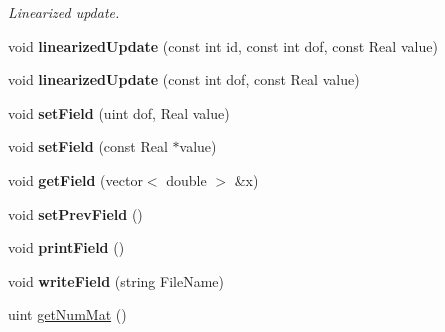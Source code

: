 \begin{DoxyCompactItemize}
\begin{DoxyCompactList}\small\item\em Linearized update. \item\end{DoxyCompactList}\item 
\hypertarget{classvoom_1_1_l_b_model_a55fa144f27472b376293a8aa0a537ddc}{
void {\bfseries linearizedUpdate} (const int id, const int dof, const Real value)}
\label{classvoom_1_1_l_b_model_a55fa144f27472b376293a8aa0a537ddc}

\item 
\hypertarget{classvoom_1_1_l_b_model_acbe155affa8540032f389c3feb633ec1}{
void {\bfseries linearizedUpdate} (const int dof, const Real value)}
\label{classvoom_1_1_l_b_model_acbe155affa8540032f389c3feb633ec1}

\item 
\hypertarget{classvoom_1_1_l_b_model_a86f401fee7322d5b026bb40ad4b2b84b}{
void {\bfseries setField} (uint dof, Real value)}
\label{classvoom_1_1_l_b_model_a86f401fee7322d5b026bb40ad4b2b84b}

\item 
\hypertarget{classvoom_1_1_l_b_model_ac0c33c0e119934319c188d385bbc5db5}{
void {\bfseries setField} (const Real $\ast$value)}
\label{classvoom_1_1_l_b_model_ac0c33c0e119934319c188d385bbc5db5}

\item 
\hypertarget{classvoom_1_1_l_b_model_a169a46c3f6333795817a5772746488f7}{
void {\bfseries getField} (vector$<$ double $>$ \&x)}
\label{classvoom_1_1_l_b_model_a169a46c3f6333795817a5772746488f7}

\item 
\hypertarget{classvoom_1_1_l_b_model_a712027658695b2ea2dd36497a0cf2823}{
void {\bfseries setPrevField} ()}
\label{classvoom_1_1_l_b_model_a712027658695b2ea2dd36497a0cf2823}

\item 
\hypertarget{classvoom_1_1_l_b_model_aaadb7e6c835a1a8a5fadae3ca896803e}{
void {\bfseries printField} ()}
\label{classvoom_1_1_l_b_model_aaadb7e6c835a1a8a5fadae3ca896803e}

\item 
\hypertarget{classvoom_1_1_l_b_model_a23d034aa85bdd55e20a2b149f30de1e4}{
void {\bfseries writeField} (string FileName)}
\label{classvoom_1_1_l_b_model_a23d034aa85bdd55e20a2b149f30de1e4}

\item 
\hypertarget{classvoom_1_1_l_b_model_a7ff15504745f43ecb0f0272384a42297}{
uint \hyperlink{classvoom_1_1_l_b_model_a7ff15504745f43ecb0f0272384a42297}{getNumMat} ()}
\label{classvoom_1_1_l_b_model_a7ff15504745f43ecb0f0272384a42297}


\end{DoxyCompactItemize}
